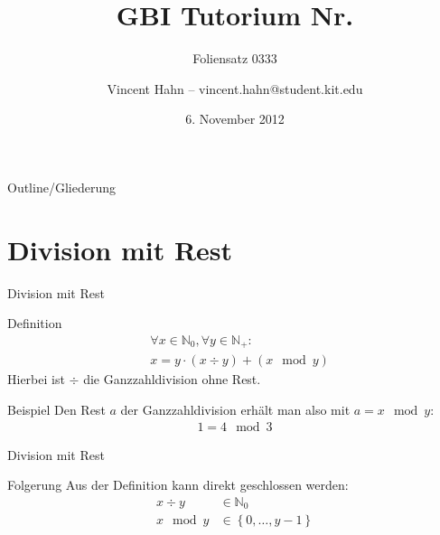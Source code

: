 \documentclass[18pt]{beamer}
\title[GBI Tutorium]{GBI Tutorium Nr. }
\subtitle{Foliensatz 0333}
\date{6. November 2012}
\author{Vincent Hahn -- vincent.hahn@student.kit.edu}
\institute{Institut für theoretische Informatik}
\begin{document}

\begin{frame}
    \titlepage
\end{frame}

\begin{frame}{Outline/Gliederung}
    \tableofcontents
\end{frame}

\section{Division mit Rest}

\begin{frame}{Division mit Rest}
    \begin{block}{Definition}
        \begin{align*}
            &\forall x \in \mathbb{N}_0, \forall y \in \mathbb{N}_+:\\
            &x = y\cdot\left( x \div y\right) + \left( x\mod y\right)
        \end{align*}
        Hierbei ist $\div$ die Ganzzahldivision ohne Rest.
    \end{block}
    \pause
    \begin{exampleblock}{Beispiel}
        Den Rest $a$ der Ganzzahldivision erhält man also mit $a = x \mod y$:
        \begin{align*}
            1 = 4 \mod 3
        \end{align*}
    \end{exampleblock}
\end{frame}

\begin{frame}{Division mit Rest}
    \begin{block}{Folgerung}
        Aus der Definition kann direkt geschlossen werden:
        \begin{align*}
            x \div y &\in \mathbb{N}_0\\
            x \mod y &\in \left\{ 0, \dots , y-1\right\}
        \end{align*}
    \end{block}
\end{frame}
\end{document}
